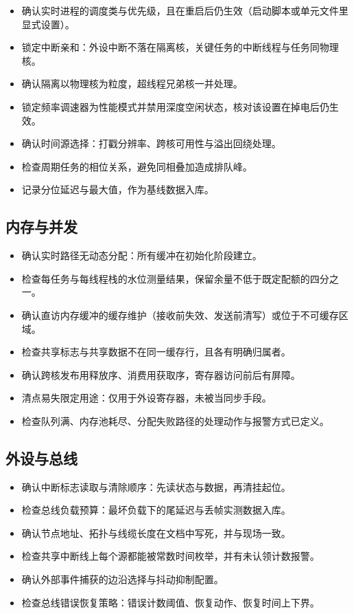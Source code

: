 \documentclass[12pt,a4paper,fontset=fandol]{ctexbook}
\begin{document}
\begin{itemize}
\item 确认实时进程的调度类与优先级，且在重启后仍生效（启动脚本或单元文件里显式设置）。
\item 锁定中断亲和：外设中断不落在隔离核，关键任务的中断线程与任务同物理核。
\item 确认隔离以物理核为粒度，超线程兄弟核一并处理。
\item 锁定频率调速器为性能模式并禁用深度空闲状态，核对该设置在掉电后仍生效。
\item 确认时间源选择：打戳分辨率、跨核可用性与溢出回绕处理。
\item 检查周期任务的相位关系，避免同相叠加造成排队峰。
\item 记录分位延迟与最大值，作为基线数据入库。
\end{itemize}

\subsection{内存与并发}

\begin{itemize}
\item 确认实时路径无动态分配：所有缓冲在初始化阶段建立。
\item 检查每任务与每线程栈的水位测量结果，保留余量不低于既定配额的四分之一。
\item 确认直访内存缓冲的缓存维护（接收前失效、发送前清写）或位于不可缓存区域。
\item 检查共享标志与共享数据不在同一缓存行，且各有明确归属者。
\item 确认跨核发布用释放序、消费用获取序，寄存器访问前后有屏障。
\item 清点易失限定用途：仅用于外设寄存器，未被当同步手段。
\item 检查队列满、内存池耗尽、分配失败路径的处理动作与报警方式已定义。
\end{itemize}

\subsection{外设与总线}

\begin{itemize}
\item 确认中断标志读取与清除顺序：先读状态与数据，再清挂起位。
\item 检查总线负载预算：最坏负载下的尾延迟与丢帧实测数据入库。
\item 确认节点地址、拓扑与线缆长度在文档中写死，并与现场一致。
\item 检查共享中断线上每个源都能被常数时间枚举，并有未认领计数报警。
\item 确认外部事件捕获的边沿选择与抖动抑制配置。
\item 检查总线错误恢复策略：错误计数阈值、恢复动作、恢复时间上下界。
\end{itemize}
\end{document}

